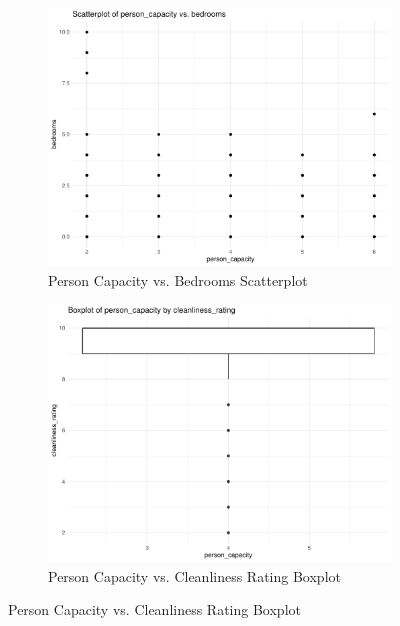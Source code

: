 \documentclass[12pt, letterpaper]{article}
\begin{document}
\begin{figure}[H]
  \begin{subfigure}{0.45\textwidth}
    \includegraphics[width=\linewidth]{person_capacity_bedrooms__scatterplot.pdf}
    \caption{Person Capacity vs. Bedrooms Scatterplot}
    \label{fig:person_capacity_bedrooms__scatterplot}
  \end{subfigure}
  \hspace{0.05\textwidth}
  \begin{subfigure}{0.45\textwidth}
    \includegraphics[width=\linewidth]{person_capacity_cleanliness_rating__boxplot.pdf}
    \caption{Person Capacity vs. Cleanliness Rating Boxplot}
    \label{fig:person_capacity_cleanliness_rating__boxplot}
  \end{subfigure}


\end{figure}
\end{document}
